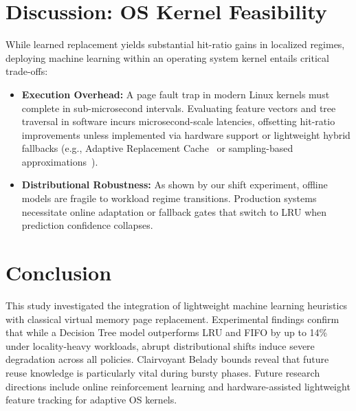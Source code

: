 \documentclass[10pt,twocolumn,a4paper]{article}
\begin{document}
\section{Discussion: OS Kernel Feasibility}
While learned replacement yields substantial hit-ratio gains in localized regimes, deploying machine learning within an operating system kernel entails critical trade-offs:
\begin{itemize}
    \item \textbf{Execution Overhead:} A page fault trap in modern Linux kernels must complete in sub-microsecond intervals. Evaluating feature vectors and tree traversal in software incurs microsecond-scale latencies, offsetting hit-ratio improvements unless implemented via hardware support or lightweight hybrid fallbacks (e.g., Adaptive Replacement Cache~\cite{megiddo2003arc} or sampling-based approximations~\cite{johnson19942q}).
    \item \textbf{Distributional Robustness:} As shown by our shift experiment, offline models are fragile to workload regime transitions. Production systems necessitate online adaptation or fallback gates that switch to LRU when prediction confidence collapses.
\end{itemize}

\section{Conclusion}
This study investigated the integration of lightweight machine learning heuristics with classical virtual memory page replacement. Experimental findings confirm that while a Decision Tree model outperforms LRU and FIFO by up to 14\% under locality-heavy workloads, abrupt distributional shifts induce severe degradation across all policies. Clairvoyant Belady bounds reveal that future reuse knowledge is particularly vital during bursty phases. Future research directions include online reinforcement learning and hardware-assisted lightweight feature tracking for adaptive OS kernels.



\end{document}
